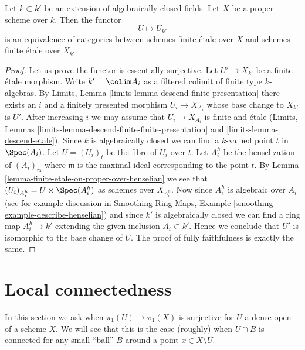 \begin{lemma}
\label{lemma-finite-etale-invariant-over-proper}
Let $k \subset k'$ be an extension of algebraically closed fields.
Let $X$ be a proper scheme over $k$. Then the functor
$$
U \longmapsto U_{k'}
$$
is an equivalence of categories between schemes finite \'etale over
$X$ and schemes finite \'etale over $X_{k'}$.
\end{lemma}

\begin{proof}
Let us prove the functor is essentially surjective.
Let $U' \to X_{k'}$ be a finite \'etale morphism.
Write $k' = \colim A_i$ as a filtered colimit of finite type $k$-algebras.
By Limits, Lemma \ref{limits-lemma-descend-finite-presentation}
there exists an $i$ and a finitely presented morphism $U_i \to X_{A_i}$
whose base change to $X_{k'}$ is $U'$. After increasing $i$
we may assume that $U_i \to X_{A_i}$ is finite and \'etale
(Limits, Lemmas \ref{limits-lemma-descend-finite-finite-presentation} and
\ref{limits-lemma-descend-etale}).
Since $k$ is algebraically closed we can find a
$k$-valued point $t$ in $\Spec(A_i)$. Let $U = (U_i)_t$ be the
fibre of $U_i$ over $t$. Let $A_i^h$ be the
henselization of $(A_i)_{\mathfrak m}$ where $\mathfrak m$ is
the maximal ideal corresponding to the point $t$. By
Lemma \ref{lemma-finite-etale-on-proper-over-henselian}
we see that $(U_i)_{A_i^h} = U \times \Spec(A_i^h)$ as schemes
over $X_{A_i^h}$. Now since
$A_i^h$ is algebraic over $A_i$ (see for example discussion in
Smoothing Ring Maps, Example \ref{smoothing-example-describe-henselian})
and since $k'$ is algebraically closed
we can find a ring map $A_i^h \to k'$ extending the given
inclusion $A_i \subset k'$. Hence we conclude that $U'$
is isomorphic to the base change of $U$.
The proof of fully faithfulness is exactly the same.
\end{proof}








\section{Local connectedness}
\label{section-unibranch}

\noindent
In this section we ask when $\pi_1(U) \to \pi_1(X)$ is surjective
for $U$ a dense open of a scheme $X$. We will see that this is the
case (roughly) when $U \cap B$ is connected for any small
``ball'' $B$ around a point $x \in X \setminus U$.

